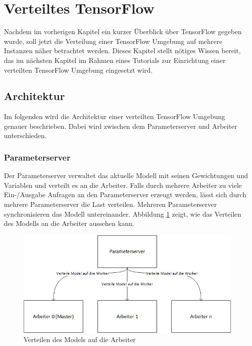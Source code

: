 \section{Verteiltes TensorFlow}
Nachdem im vorherigen Kapitel ein kurzer Überblick über TensorFlow gegeben wurde, soll jetzt die Verteilung einer TensorFlow Umgebung auf mehrere Instanzen näher betrachtet werden. Dieses Kapitel stellt nötiges Wissen bereit, das im nächsten Kapitel im Rahmen eines Tutorials zur Einrichtung einer verteilten TensorFlow Umgebung eingesetzt wird. 

\subsection{Architektur}
Im folgenden wird die Architektur einer verteilten TensorFlow Umgebung genauer beschrieben. Dabei wird zwischen dem Parameterserver und Arbeiter unterschieden.

\subsubsection{Parameterserver}
Der Parameterserver verwaltet das aktuelle Modell mit seinen Gewichtungen und Variablen und verteilt es an die Arbeiter. Falls durch mehrere Arbeiter zu viele Ein-/Ausgabe Anfragen an den Parameterserver erzeugt werden, lässt sich durch mehrere Parameterserver die Last verteilen. Mehreren Parameterserver synchronisieren das Modell untereinander. Abbildung \ref{fig:architektur-servemodel} zeigt, wie das Verteilen des Modells an die Arbeiter aussehen kann. 

\begin{figure}[h!]
	\centering
	\includegraphics[width=1\linewidth]{Pictures/Architektur-ServeModel}
	\caption[Verteilen des Models auf die Arbeiter]{Verteilen des Models auf die Arbeiter}
	\label{fig:architektur-servemodel}
\end{figure}

